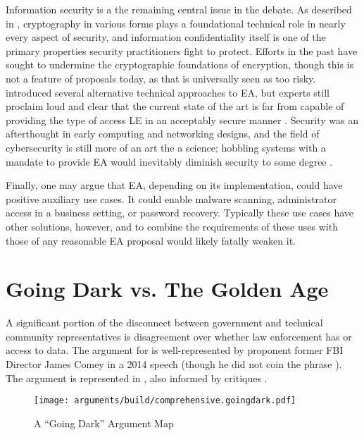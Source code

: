 Information security is a the remaining central issue in the debate. As described in ,
\ac{cryptography} in various forms plays a foundational technical role in nearly every aspect of security, and
information confidentiality itself is one of the primary properties security practitioners fight to protect. Efforts in
the past have sought to undermine the cryptographic foundations of encryption, though this is not a feature of proposals
today, as that is universally seen as too risky.  introduced several alternative technical
approaches to \ac{EA}, but experts still proclaim loud and clear that the current state of the art is far from capable
of providing the type of access \acl{LE} in an acceptably secure manner \cite{abelson_2015} \cite{abelson_risks_1997}.
Security was an afterthought in early computing and networking designs, and the field of cybersecurity is still more of
an art the a science; hobbling systems with a mandate to provide \ac{EA} would inevitably diminish security to some
degree \cite{abelson_2015}.

Finally, one may argue that \ac{EA}, depending on its implementation, could have positive auxiliary use cases. It could
enable malware scanning, administrator access in a business setting, or password recovery. Typically these use cases
have other solutions, however, and to combine the requirements of these uses with those of any reasonable \ac{EA}
proposal would likely fatally weaken it.


\section{Going Dark vs. The Golden Age}

A significant portion of the disconnect between government and technical community representatives is disagreement over
whether law enforcement has  or  access to data. The argument for  is
well-represented by proponent former \ac{FBI} Director James Comey in a 2014 speech \cite{comey_2014} (though he did not
coin the phrase \cite{swire_encryption_2011}). The argument is represented in , also informed
by critiques \cite{rogaway_moral_2015}.

\begin{figure}[t!]
  \centering\CaptionFontSize
  \texttt{[image: arguments/build/comprehensive.goingdark.pdf]}
  \caption{A ``Going Dark'' Argument Map}
  \label{fig-arg-going-dark}
\end{figure}

